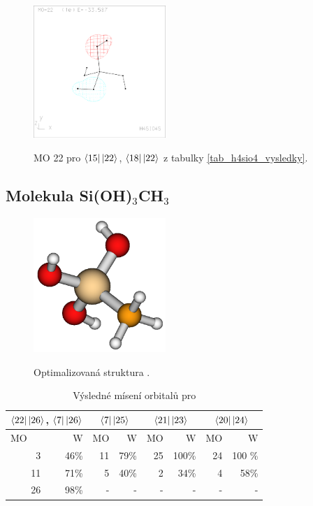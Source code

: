\documentclass[
  digital, %
  table,   %
  lof,     %
  lot,     %
]{fithesis3}
\begin{document}
\begin{figure}[h]
\caption{MO 22 pro $\bra{15}\ket{22}$, $\bra{18}\ket{22}$ z tabulky \ref{tab_h4sio4_vysledky}.  }
  \center
  \includegraphics[width=5cm]{h4sio4_obrazky/s3__22.eps}
  \label{obr_h4sio4_MO_s3_22}
  \end{figure}
  
\subsection{Molekula Si(OH)$_3$CH$_3$}
\begin{figure}[h!]
\caption{Optimalizovaná struktura . }
  \center
  \includegraphics[width=5cm]{si(oh)3ch3_obr.png}
  \label{obr_sioh3ch3_opt_struktura}
  \end{figure}
  
\begin{table}[htbp]
\caption{Výsledné mísení orbitalů pro }
\begin{center}
\begin{tabular}{|r|r|r|r|r|r|r|r|}
\hline
\multicolumn{2}{|c|}{$\bra{22}\ket{26}$, $\bra{7}\ket{26}$} & \multicolumn{2}{|c|}{$\bra{7}\ket{25}$}& \multicolumn{2}{|c|}{$\bra{21}\ket{23}$} &\multicolumn{2}{|c|}{$\bra{20}\ket{24}$} \\
\hline
\hline
\multicolumn{1}{|l|}{MO} & \multicolumn{1}{r|}{W} & \multicolumn{1}{l|}{MO} & \multicolumn{1}{r|}{W} & MO & \multicolumn{1}{r|}{W}& MO & \multicolumn{1}{r|}{W} \\ \hline
3 & 46\% & 11 & 79\% &25 & 100\%& 24 & 100 \% \\ \hline
11 & 71\% & 5 & 40\% & 2 & 34\% &4 & 58\% \\ \hline
26 & 98\% & - & - &  -& - &-&- \\ \hline
\end{tabular}
\end{center}
\label{tab_sioh3ch3_vysledky}
\end{table}
\end{document}
